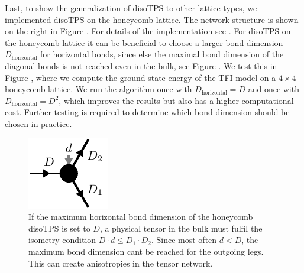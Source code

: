 %
Last, to show the generalization of disoTPS to other lattice types, we implemented disoTPS on the honeycomb lattice. The network structure is shown on the right in Figure . For details of the implementation see \cite{}. For disoTPS on the honeycomb lattice it can be beneficial to choose a larger bond dimension $D_\text{horizontal}$ for horizontal bonds, since else the maximal bond dimension of the diagonal bonds is not reached even in the bulk, see Figure . We test this in Figure , where we compute the ground state energy of the TFI model on a $4\times4$ honeycomb lattice. We run the algorithm once with $D_\text{horizontal} = D$ and once with $D_\text{horizontal} = D^2$, which improves the results but also has a higher computational cost. Further testing is required to determine which bond dimension should be chosen in practice.
\begin{figure}
	\centering
	\includegraphics[scale=1]{figures/tikz/TFI/hexagonal_lattice/hexagonal_lattice_horizontal_bond_problem.pdf}
	\caption{If the maximum horizontal bond dimension of the honeycomb disoTPS is set to $D$, a physical tensor in the bulk must fulfil the isometry condition $D\cdot d \le D_1\cdot D_2$. Since most often $d < D$, the maximum bond dimension cant be reached for the outgoing legs. This can create anisotropies in the tensor network.}
	\label{fig:honeycomb_horizontal_bond_problem}
\end{figure}